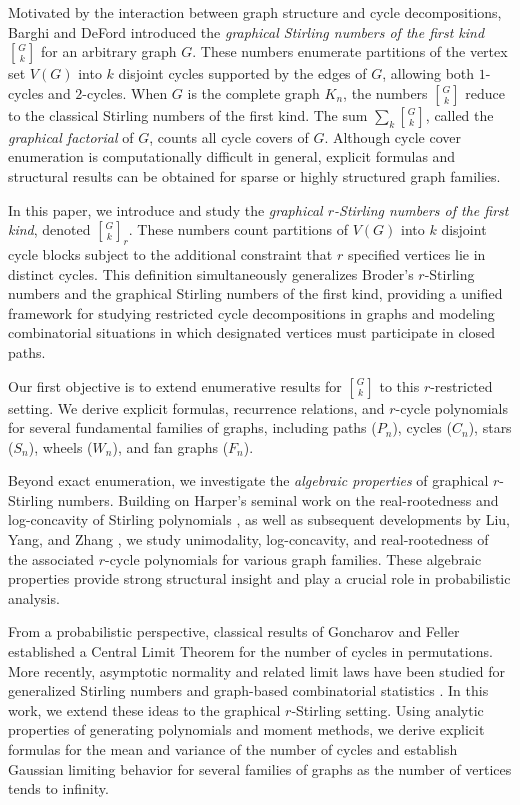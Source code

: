 \documentclass{amsart}
\theoremstyle{definition}
\begin{document}
Motivated by the interaction between graph structure and cycle decompositions,
Barghi and DeFord \cite{Barghi2023} introduced the \emph{graphical Stirling
numbers of the first kind} ${G \brack k}$ for an arbitrary graph $G$. These
numbers enumerate partitions of the vertex set $V(G)$ into $k$ disjoint cycles
supported by the edges of $G$, allowing both $1$-cycles and $2$-cycles. When
$G$ is the complete graph $K_n$, the numbers ${G \brack k}$ reduce to the
classical Stirling numbers of the first kind. The sum $\sum_k {G \brack k}$,
called the \emph{graphical factorial} of $G$, counts all cycle covers of $G$.
Although cycle cover enumeration is computationally difficult in general,
explicit formulas and structural results can be obtained for sparse or highly
structured graph families.

In this paper, we introduce and study the \emph{graphical $r$-Stirling numbers of
the first kind}, denoted ${G \brack k}_r$. These numbers count partitions of
$V(G)$ into $k$ disjoint cycle blocks subject to the additional constraint that
$r$ specified vertices lie in distinct cycles. This definition simultaneously
generalizes Broder’s $r$-Stirling numbers and the graphical Stirling numbers of
the first kind, providing a unified framework for studying restricted cycle
decompositions in graphs and modeling combinatorial situations in which
designated vertices must participate in closed paths.

Our first objective is to extend enumerative results for ${G \brack k}$ to this
$r$-restricted setting. We derive explicit formulas, recurrence relations, and
$r$-cycle polynomials for several fundamental families of graphs, including
paths ($P_n$), cycles ($C_n$), stars ($S_n$), wheels ($W_n$), and fan graphs
($F_n$). 

Beyond exact enumeration, we investigate the \emph{algebraic properties} of
graphical $r$-Stirling numbers. Building on Harper’s seminal work on the
real-rootedness and log-concavity of Stirling polynomials \cite{Harper1967}, as
well as subsequent developments by Liu, Yang, and Zhang
\cite{LiuYangZhang2012,LiuYangZhang2014}, we study unimodality, log-concavity, and
real-rootedness of the associated $r$-cycle polynomials for various graph
families. These algebraic properties provide strong structural insight and play
a crucial role in probabilistic analysis.

From a probabilistic perspective, classical results of Goncharov
\cite{Goncharov1944} and Feller \cite{Feller1968} established a Central Limit
Theorem for the number of cycles in permutations. More recently, asymptotic
normality and related limit laws have been studied for generalized Stirling
numbers and graph-based combinatorial statistics
\cite{DuncanPeele2009,GalvinThanh2013}. In this work, we extend these ideas to the
graphical $r$-Stirling setting. Using analytic properties of generating
polynomials and moment methods, we derive explicit formulas for the mean and
variance of the number of cycles and establish Gaussian limiting behavior for
several families of graphs as the number of vertices tends to infinity.
\end{document}
